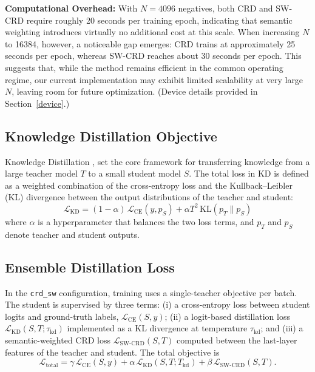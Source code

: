\documentclass{article}
\theoremstyle{plain}
\theoremstyle{remark}
\begin{document}
\textbf{Computational Overhead:} With $N = 4096$ negatives, both CRD and SW-CRD require roughly 20 seconds per training epoch, indicating that semantic weighting introduces virtually no additional cost at this scale. When increasing $N$ to 16384, however, a noticeable gap emerges: CRD trains at approximately 25 seconds per epoch, whereas SW-CRD reaches about 30 seconds per epoch. This suggests that, while the method remains efficient in the common operating regime, our current implementation may exhibit limited scalability at very large $N$, leaving room for future optimization. (Device details provided in Section~\ref{device}.)


\subsection{Knowledge Distillation Objective}

Knowledge Distillation \citep{hinton2015distilling}, set the core framework for transferring knowledge from a large teacher model $T$ to a small student model $S$. 
The total loss in KD is defined as a weighted combination of the cross-entropy loss and the Kullback--Leibler (KL) divergence between the output distributions of the teacher and student:
\begin{equation}
    \mathcal{L}_{\text{KD}} = (1 - \alpha)\, \mathcal{L}_{\text{CE}}(y, p_S) + \alpha T^2 \, \text{KL}(p_T \| p_S)
\end{equation}
where $\alpha$ is a hyperparameter that balances the two loss terms, and $p_T$ and $p_S$ denote teacher and student outputs.

\subsection{Ensemble Distillation Loss}

In the \texttt{crd\_sw} configuration, training uses a single-teacher objective per batch. The student is supervised by three terms: (i) a cross-entropy loss between student logits and ground-truth labels, $\mathcal{L}_{\text{CE}}(S,y)$; (ii) a logit-based distillation loss $\mathcal{L}_{\text{KD}}(S,T; \tau_{\text{kd}})$ implemented as a KL divergence at temperature $\tau_{\text{kd}}$; and (iii) a semantic-weighted CRD loss $\mathcal{L}_{\text{SW-CRD}}(S,T)$ computed between the last-layer features of the teacher and student. The total objective is
\begin{equation}
  \mathcal{L}_{\text{total}}
  =
  \gamma\,\mathcal{L}_{\text{CE}}(S,y)
  +
  \alpha\,\mathcal{L}_{\text{KD}}(S,T; T_{\text{kd}})
  +
  \beta\,\mathcal{L}_{\text{SW-CRD}}(S,T).
  \label{eq:totla-loss}
\end{equation}
\end{document}
